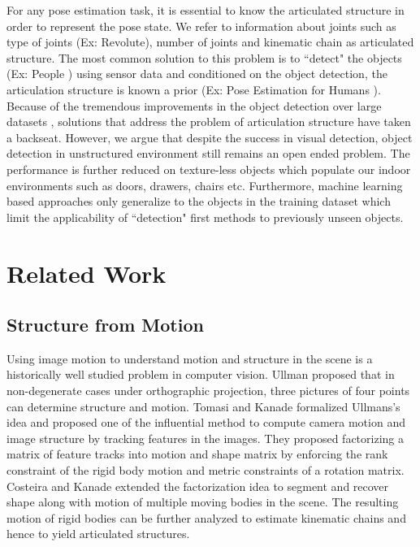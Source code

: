\documentclass[conference]{IEEEtran}
\begin{document}
For any pose estimation task, it is essential to know the articulated structure in order to represent the pose state. We refer to information about joints such as type of joints (Ex: Revolute), number of joints and kinematic chain as articulated structure. The most common solution to this problem is to ``detect" the objects (Ex: People \cite{girshick2014rich}) using sensor data and conditioned on the object detection, the articulation structure is known a prior (Ex: Pose Estimation for Humans \cite{yang2011articulated}). Because of the tremendous improvements in the object detection over large datasets \cite{krizhevsky2012imagenet}, solutions that address the problem of articulation structure have taken a backseat. However, we argue that despite the success in visual detection, object detection in unstructured environment still remains an open ended problem. The performance is further reduced on texture-less objects \cite{choi20123d} which populate our indoor environments such as doors, drawers, chairs etc. Furthermore, machine learning based approaches only generalize to the objects in the training dataset which limit the applicability of ``detection" first methods to previously unseen objects.


\section{Related Work}

\subsection{Structure from Motion}
Using image motion to understand motion and structure in the scene is a historically well studied problem in computer vision.  Ullman \cite{ullman1979interpretation} proposed that in non-degenerate cases under orthographic projection, three pictures of four points can determine structure and motion. Tomasi and Kanade \cite{tomasi1992shape} formalized Ullmans's idea and proposed one of the influential method to compute camera motion and image structure by tracking features in the images. They proposed factorizing a matrix of feature tracks into motion and shape matrix by enforcing the rank constraint of the rigid body motion and metric constraints of a rotation matrix. Costeira and Kanade \cite{costeira1998multibody} extended the factorization idea to segment and recover shape along with motion of multiple moving bodies in the scene. The resulting motion of rigid bodies can be further analyzed to estimate kinematic chains \cite{yan2006automatic} and hence to yield articulated structures. 
\end{document}
